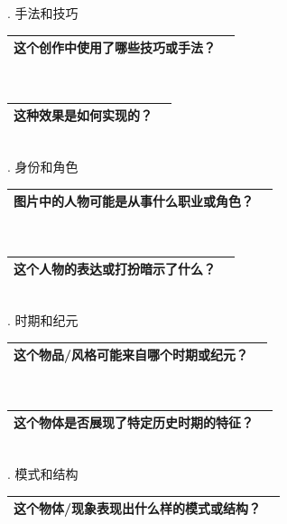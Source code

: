 \documentclass[12pt]{book}
\begin{document}
. 手法和技巧

\begin{tabular}{|p{15cm}|p{3cm}|}
	\hline
这个创作中使用了哪些技巧或手法？\\
	\hline
\end{tabular}\\



\begin{tabular}{|p{15cm}|p{3cm}|}
	\hline
这种效果是如何实现的？\\
	\hline
\end{tabular}\\



. 身份和角色

\begin{tabular}{|p{15cm}|p{3cm}|}
	\hline
图片中的人物可能是从事什么职业或角色？\\
	\hline
\end{tabular}\\


\begin{tabular}{|p{15cm}|p{3cm}|}
	\hline
这个人物的表达或打扮暗示了什么？\\
	\hline
\end{tabular}\\



. 时期和纪元

\begin{tabular}{|p{15cm}|p{3cm}|}
	\hline
这个物品/风格可能来自哪个时期或纪元？\\
	\hline
\end{tabular}\\



\begin{tabular}{|p{15cm}|p{3cm}|}
	\hline
这个物体是否展现了特定历史时期的特征？\\
	\hline
\end{tabular}\\



. 模式和结构

\begin{tabular}{|p{15cm}|p{3cm}|}
	\hline
这个物体/现象表现出什么样的模式或结构？\\
	\hline
\end{tabular}\\
\end{document}
